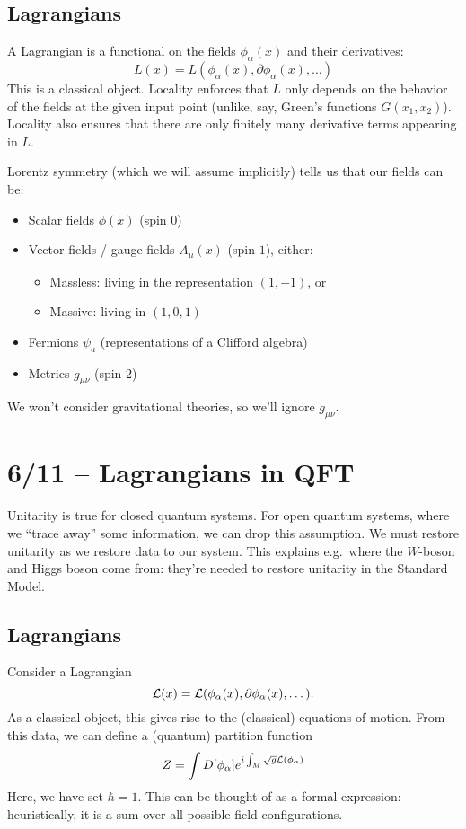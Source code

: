 \subsection{Lagrangians}

A Lagrangian is a functional on the fields $\phi_\alpha(x)$ and their derivatives:
\[
	L(x) = L(\phi_\alpha(x), \partial \phi_\alpha(x), \dots)
\]
This is a classical object.
Locality enforces that $L$ only depends on the behavior of the fields at the given input point (unlike, say, Green's functions $G(x_1, x_2)$).
Locality also ensures that there are only finitely many derivative terms appearing in $L$.

Lorentz symmetry (which we will assume implicitly) tells us that our fields can be:
\begin{itemize}
	\item Scalar fields $\phi(x)$ (spin $0$)
	\item Vector fields / gauge fields $A_\mu(x)$ (spin $1$), either:
		\begin{itemize}
			\item Massless: living in the representation $(1, -1)$, or
			\item Massive: living in $(1, 0, 1)$
		\end{itemize}
	\item Fermions $\psi_a$ (representations of a Clifford algebra)
	\item Metrics $g_{\mu \nu}$ (spin $2$)
\end{itemize}
We won't consider gravitational theories, so we'll ignore $g_{\mu \nu}$.

\section{6/11 -- Lagrangians in QFT}

Unitarity is true for closed quantum systems.
For open quantum systems, where we ``trace away'' some information, we can drop this assumption.
We must restore unitarity as we restore data to our system.
This explains e.g.\ where the $W$-boson and Higgs boson come from: they're needed to restore unitarity in the Standard Model.

\subsection{Lagrangians}

Consider a Lagrangian
\[
	\mathcal{L}(x) = \mathcal{L}(\phi_\alpha(x), \partial \phi_\alpha(x), \dots).
\]
As a classical object, this gives rise to the (classical) equations of motion. From this data, we can define a (quantum) partition function
\[
	Z = \int D[\phi_\alpha] e^{i \int_M \sqrt{g} \mathcal{L}(\phi_\alpha)}
\]
Here, we have set $\hbar =1$. This can be thought of as a formal expression: heuristically, it is a sum over all possible field configurations.

